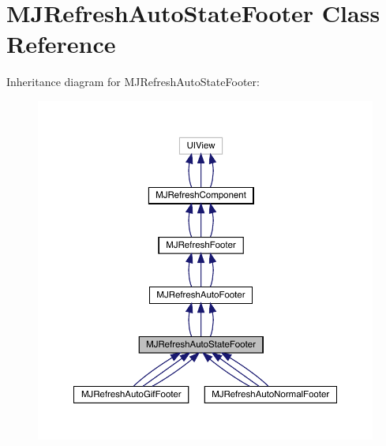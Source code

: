 \hypertarget{interface_m_j_refresh_auto_state_footer}{}\section{M\+J\+Refresh\+Auto\+State\+Footer Class Reference}
\label{interface_m_j_refresh_auto_state_footer}


Inheritance diagram for M\+J\+Refresh\+Auto\+State\+Footer\+:\nopagebreak
\begin{figure}[H]
\begin{center}
\leavevmode
\includegraphics[width=350pt]{interface_m_j_refresh_auto_state_footer__inherit__graph}
\end{center}
\end{figure}



